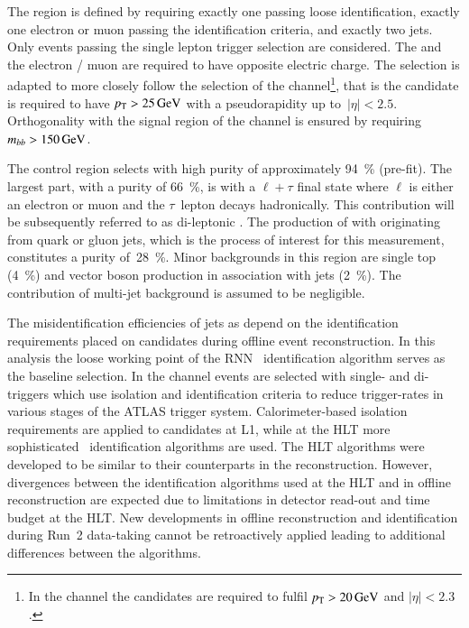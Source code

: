 The region is defined by requiring exactly one \tauhadvis passing
loose identification, exactly one electron or muon passing the
identification criteria, and exactly two \btagged
jets. Only events passing the single lepton trigger selection are
considered. The \tauhadvis and the electron / muon are required to
have opposite electric charge. The \tauhadvis selection is adapted to
more closely follow the selection of the \hadhad channel\footnote{In
  the \lephad channel the \tauhadvis candidates are required to fulfil
  $\pT > \SI{20}{\GeV}$ and $|\eta| < 2.3$.}, that is the \tauhadvis
candidate is required to have $p_{\text{T}} > \SI{25}{\ensuremath{\text{GeV}}}$ with a
pseudorapidity up to~$|\eta| < 2.5$. Orthogonality with the signal
region of the \lephad channel is ensured by requiring
$m_{bb} > \SI{150}{\ensuremath{\text{GeV}}}$.


The control region selects \ttbar with high purity of approximately
\SI{94}{\percent} (pre-fit). The largest part, with a purity of
\SI{66}{\percent}, is \ttbar with a $\ell + \tau$ final state where
$\ell$ is either an electron or muon and the $\tau$~lepton decays
hadronically. This contribution will be subsequently referred to as
di-leptonic \ttbar. The production of \ttbar with \tauhadvis
originating from quark or gluon jets, which is the process of interest
for this measurement, constitutes a purity of~\SI{28}{\percent}.
Minor backgrounds in this region are single top (\SI{4}{\percent}) and
vector boson production in association with jets
(\SI{2}{\percent}). The contribution of multi-jet background is
assumed to be negligible.



The misidentification efficiencies of jets as \tauhadvis depend on the
identification requirements placed on \tauhadvis candidates during
offline event reconstruction. In this analysis the loose working point
of the RNN \tauhadvis~identification algorithm serves as the baseline
\tauhadvis selection. In the \hadhad channel events are selected with
single- and di-\tauhadvis triggers which use isolation and
identification criteria to reduce trigger-rates in various stages of
the ATLAS trigger system. Calorimeter-based isolation requirements are
applied to \tauhadvis candidates at L1, while at the HLT more
sophisticated \tauhadvis~identification algorithms are used.  The HLT
algorithms were developed to be similar to their counterparts in the
\tauhadvis reconstruction. However, divergences between the
identification algorithms used at the HLT and in offline \tauhadvis
reconstruction are expected due to limitations in detector read-out
and time budget at the HLT. New developments in offline \tauhadvis
reconstruction and identification during Run~2 data-taking cannot be
retroactively applied leading to additional differences between the
algorithms.

